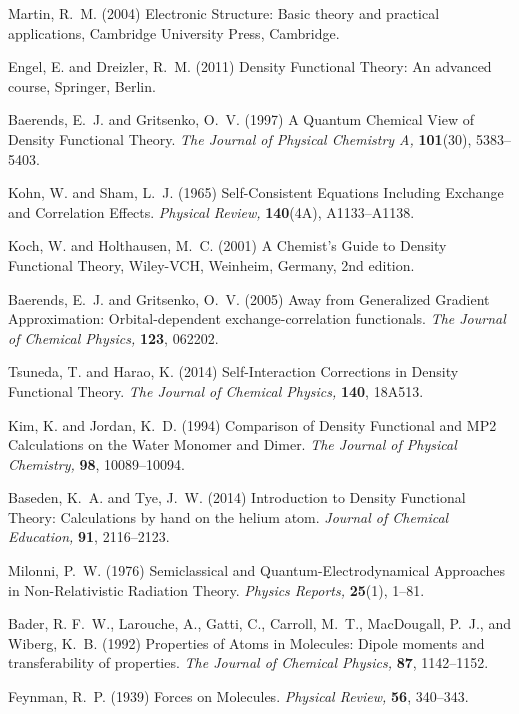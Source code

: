 \documentclass[12pt,onecolumn,secnumarabic,amsmath,amssymb,balancelastpage,nofootinbib]{article}
\begin{document}
\begin{thebibliography}{100}
Martin, R.~M. (2004)
Electronic Structure: Basic theory and practical applications,
Cambridge University Press, Cambridge.

Engel, E. and Dreizler, R.~M. (2011)
Density Functional Theory: An advanced course,
Springer, Berlin.

Baerends, E.~J. and Gritsenko, O.~V. (1997)
A Quantum Chemical View of Density Functional Theory.
{\em The Journal of Physical Chemistry A,} {\bf 101}(30), 5383--5403.

Kohn, W. and Sham, L.~J. (1965)
Self-Consistent Equations Including Exchange and Correlation Effects.
{\em Physical Review,} {\bf 140}(4A), A1133--A1138.

Koch, W. and Holthausen, M.~C. (2001)
A Chemist's Guide to Density Functional Theory,
Wiley-VCH, Weinheim, Germany, 2nd edition.

Baerends, E.~J. and Gritsenko, O.~V. (2005)
Away from Generalized Gradient Approximation: Orbital-dependent
  exchange-correlation functionals.
{\em The Journal of Chemical Physics,} {\bf 123}, 062202.

Tsuneda, T. and Harao, K. (2014)
Self-Interaction Corrections in Density Functional Theory.
{\em The Journal of Chemical Physics,} {\bf 140}, 18A513.

Kim, K. and Jordan, K.~D. (1994)
Comparison of Density Functional and MP2 Calculations on the Water Monomer and
  Dimer.
{\em The Journal of Physical Chemistry,} {\bf 98}, 10089--10094.

Baseden, K.~A. and Tye, J.~W. (2014)
Introduction to Density Functional Theory: Calculations by hand on the helium
  atom.
{\em Journal of Chemical Education,} {\bf 91}, 2116--2123.

Milonni, P.~W. (1976)
Semiclassical and Quantum-Electrodynamical Approaches in Non-Relativistic
  Radiation Theory.
{\em Physics Reports,} {\bf 25}(1), 1--81.

Bader, R. F.~W., Larouche, A., Gatti, C., Carroll, M.~T., MacDougall, P.~J.,
  and Wiberg, K.~B. (1992)
Properties of Atoms in Molecules: Dipole moments and transferability of
  properties.
{\em The Journal of Chemical Physics,} {\bf 87}, 1142--1152.

Feynman, R.~P. (1939)
Forces on Molecules.
{\em Physical Review,} {\bf 56}, 340--343.


\end{thebibliography}
\end{document}

